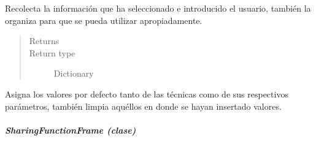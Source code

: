 \documentclass[letterpaper,10pt,english]{sphinxmanual}
\begin{document}
\begin{fulllineitems}
\begin{fulllineitems}
\label{View/Main/MOEA/AlgorithmFrame:View.Main.MOEA.AlgorithmFrame.AlgorithmFrame.get_information}
Recolecta la información que ha seleccionado e introducido el usuario,
también la organiza para que se pueda utilizar apropiadamente.
\begin{quote}\begin{description}
\item[{Returns}] \leavevmode



\item[{Return type}] \leavevmode
Dictionary

\end{description}\end{quote}

\end{fulllineitems}


\begin{fulllineitems}
\label{View/Main/MOEA/AlgorithmFrame:View.Main.MOEA.AlgorithmFrame.AlgorithmFrame.restore_settings}
Asigna los valores por defecto tanto de las técnicas como de sus 
respectivos parámetros, también limpia aquéllos en donde se hayan 
insertado valores.

\end{fulllineitems}


\end{fulllineitems}



\subparagraph{SharingFunctionFrame (clase)}
\label{View/Main/MOEA/SharingFunctionFrame:module-View.Main.MOEA.SharingFunctionFrame}\label{View/Main/MOEA/SharingFunctionFrame:sharingfunctionframe-clase}\label{View/Main/MOEA/SharingFunctionFrame::doc}
\end{document}
